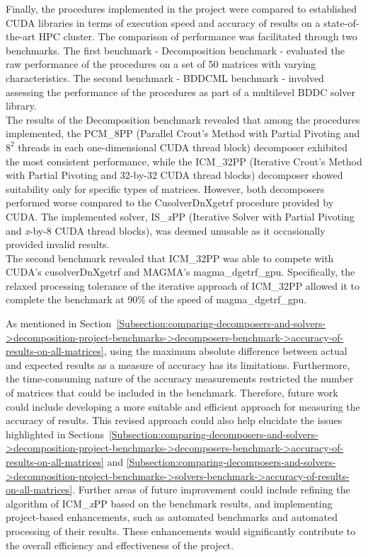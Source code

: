 Finally, the procedures implemented in the project were compared to established CUDA libraries in terms of execution speed and accuracy of results on a state-of-the-art HPC cluster.
The comparison of performance was facilitated through two benchmarks.
The first benchmark - Decomposition benchmark - evaluated the raw performance of the procedures on a set of 50 matrices with varying characteristics.
The second benchmark - BDDCML benchmark - involved assessing the performance of the procedures as part of a multilevel BDDC solver library.\\
The results of the Decomposition benchmark revealed that among the procedures implemented, the PCM\_8PP (Parallel Crout's Method with Partial Pivoting and $8^2$ threads in each one-dimensional CUDA thread block) decomposer exhibited the most consistent performance, while the ICM\_32PP (Iterative Crout's Method with Partial Pivoting and 32-by-32 CUDA thread blocks) decomposer showed suitability only for specific types of matrices.
However, both decomposers performed worse compared to the CusolverDnXgetrf procedure provided by CUDA.
The implemented solver, IS\_\textit{x}PP (Iterative Solver with Partial Pivoting and \textit{x}-by-8 CUDA thread blocks), was deemed unusable as it occasionally provided invalid results.\\
The second benchmark revealed that ICM\_32PP was able to compete with CUDA's cusolverDnXgetrf and MAGMA's magma\_dgetrf\_gpu.
Specifically, the relaxed processing tolerance of the iterative approach of ICM\_32PP allowed it to complete the benchmark at 90\% of the speed of magma\_dgetrf\_gpu.

As mentioned in Section~\ref{Subsection:comparing-decomposers-and-solvers->decomposition-project-benchmarks->decomposers-benchmark->accuracy-of-results-on-all-matrices}, using the maximum absolute difference between actual and expected results as a measure of accuracy has its limitations.
Furthermore, the time-consuming nature of the accuracy measurements restricted the number of matrices that could be included in the benchmark.
Therefore, future work could include developing a more suitable and efficient approach for measuring the accuracy of results.
This revised approach could also help elucidate the issues highlighted in Sections~\ref{Subsection:comparing-decomposers-and-solvers->decomposition-project-benchmarks->decomposers-benchmark->accuracy-of-results-on-all-matrices} and \ref{Subsection:comparing-decomposers-and-solvers->decomposition-project-benchmarks->solvers-benchmark->accuracy-of-results-on-all-matrices}.
Further areas of future improvement could include refining the algorithm of ICM\_\textit{x}PP based on the benchmark results, and implementing project-based enhancements, such as automated benchmarks and automated processing of their results.
These enhancements would significantly contribute to the overall efficiency and effectiveness of the project.